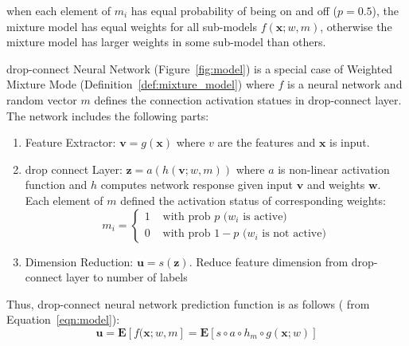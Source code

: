 \documentclass[9pt]{article}
\begin{document}
\begin{remark}
    when each element of $m_i$ has equal probability of being on and off ($p=0.5$), the mixture model
    has equal weights for all sub-models $f(\mathbf{x};w,m)$, otherwise the mixture model
    has larger weights in some sub-model than others.
\end{remark}

\begin{definition}
   \label{def:dropc_nn}
   drop-connect Neural Network (Figure~\ref{fig:model})
   is a special case of Weighted Mixture Mode (Definition~\ref{def:mixture_model})
   where $f$ is a neural network and random vector $m$ defines the connection activation statues
   in drop-connect layer. The network includes the following parts:
   \begin{enumerate}
      \item Feature Extractor: ${\mathbf v}=g({\mathbf x})$ where $v$ are the 
         features and $\mathbf x$ is input. 
      \item drop connect Layer: $\mathbf{z} = a(h({\mathbf v};w,m))$ 
         where $a$ is non-linear activation
         function and $h$ computes network response given 
         input $\mathbf v$ and weights $\mathbf w$.
         Each element of $m$ defined the activation status of corresponding weights:
         $$
         m_i=
         \left\{
            \begin{array}{ll}
               1 & \mbox{ with prob $p$ ($w_i$ is active)}\\
               0 & \mbox{ with prob $1-p$ ($w_i$ is not active)}
            \end{array}
            \right.
         $$
     \item Dimension Reduction: $\mathbf{u}=s(\mathbf{z})$. Reduce feature dimension from 
         drop-connect layer to number of labels
   \end{enumerate}
   Thus, drop-connect neural network prediction function is as follows (
   from Equation~\ref{eqn:model}):
   \begin{equation}
      \label{eqn:nnmodel}
      \mathbf{u} = \mathbf{E}\left[ f(\mathbf{x};w,m\right]
      = \mathbf{E}\left[ s\circ a\circ h_{m}\circ g(\mathbf{x};w)\right]
   \end{equation}

\end{definition}
\end{document}
